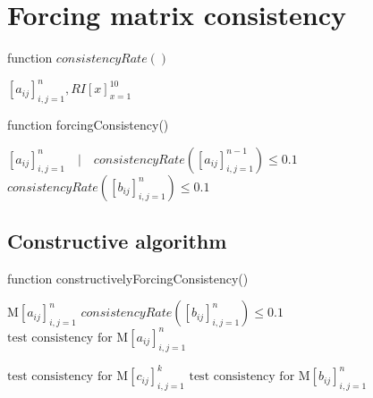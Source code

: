 \documentclass[authoryear,manuscript,12pt]{elsarticle}
\begin{document}
\section{Forcing matrix consistency}
\begin{algorithm}
\caption{function $consistencyRate()$}\label{alg:CA}
\begin{algorithmic}
\Require $[a_{ij}]_{i,j=1}^{n}, RI[x]_{x=1}^{10}$
\end{algorithmic}
\end{algorithm}

\begin{algorithm}
\caption{function forcingConsistency()}\label{alg:CA}
\begin{algorithmic}
\Require $[a_{ij}]_{i,j=1}^{n} \quad | \quad consistencyRate([a_{ij}]_{i,j=1}^{n-1}) \leq 0.1 $
\Ensure $consistencyRate([b_{ij}]_{i,j=1}^{n}) \leq 0.1$
			\State 
			\EndIf
		\Else
		\EndIf
		\EndIf
	\EndFor
\EndFor
{}
\end{algorithmic}
\end{algorithm}

\subsection{Constructive algorithm}

\begin{algorithm}
\caption{function constructivelyForcingConsistency()}\label{alg:CA}
\begin{algorithmic}
\Require $\textrm{M}[a_{ij}]_{i,j=1}^{n}$
\Ensure $consistencyRate([b_{ij}]_{i,j=1}^{n}) \leq 0.1$
\State $\textrm{test consistency for } \textrm{M}[a_{ij}]_{i,j=1}^{n}$
\Else
\EndIf

		\Else
		\EndIf
	\EndFor
	\State $\textrm{test consistency for } \textrm{M}[c_{ij}]_{i,j=1}^{k}$
	\EndIf
\EndFor
\State $\textrm{test consistency for } \textrm{M}[b_{ij}]_{i,j=1}^{n}$

\end{algorithmic}
\end{algorithm}
\end{document}
